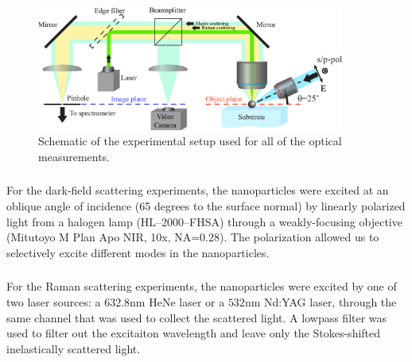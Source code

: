             \begin{figure}[h!]
                    \begin{center}
                        \includegraphics[width=0.9\textwidth]{figs/methods/expSetup2.eps}
                    \end{center}
                    \caption{Schematic of the experimental setup used for all of the optical measurements.}
                    \label{fig:expSetup}
            \end{figure}


        \subsubsection{}
            \label{sec:Darkfield}
                For the dark-field scattering experiments, the nanoparticles were excited at an oblique angle of incidence
            (65 degrees to the surface normal) by linearly polarized light from a halogen lamp (HL--2000--FHSA)
            through a weakly-focusing objective (Mitutoyo M Plan Apo NIR, 10x, NA=0.28). The polarization allowed us to
            selectively excite different modes in the nanoparticles\cite{permyakov2015probing}.

        \subsubsection{}
        \label{sec:Raman}
                For the Raman scattering experiments, the nanoparticles were excited by one of two laser sources: a $632.8$nm HeNe laser
            or a $532$nm Nd:YAG laser, through the same channel that was used to collect the scattered light. A lowpass filter was used
            to filter out the excitaiton wavelength and leave only the Stokes-shifted inelastically scattered light.

